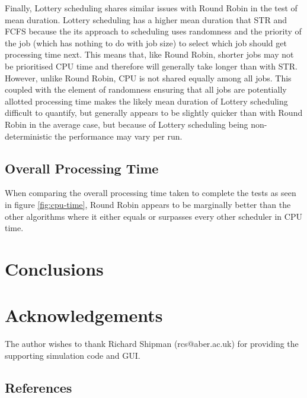 \documentclass{acm_proc_article-sp}
\begin{document}
Finally, Lottery scheduling shares similar issues with Round Robin in the test of mean duration. Lottery scheduling has a higher mean duration that STR and FCFS because the its approach to scheduling uses randomness and the priority of the job (which has nothing to do with job size) to select which job should get processing time next. This means that, like Round Robin, shorter jobs may not be prioritised CPU time and therefore will generally take longer than with STR. However, unlike Round Robin, CPU is not shared equally among all jobs. This coupled with the element of randomness ensuring that all jobs are potentially allotted processing time makes the likely mean duration of Lottery scheduling difficult to quantify, but generally appears to be slightly quicker than with Round Robin in the average case, but because of Lottery scheduling being non-deterministic the performance may vary per run.

\subsection{Overall Processing Time}
When comparing the overall processing time taken to complete the tests as seen in figure \ref{fig:cpu-time}, Round Robin appears to be marginally better than the other algorithms where it either equals or surpasses every other scheduler in CPU time.

\section{Conclusions}

\section{Acknowledgements}
The author wishes to thank Richard Shipman (rcs@aber.ac.uk) for providing the supporting simulation code and GUI.


\appendix
\subsection{References}
\balancecolumns
\end{document}
